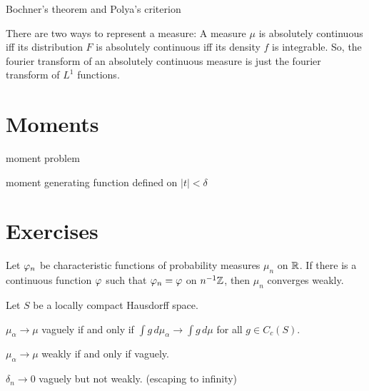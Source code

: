 \documentclass{../note}
\begin{document}
\begin{prb}
Bochner's theorem and Polya's criterion
\end{prb}


There are two ways to represent a measure:
A measure $\mu$ is absolutely continuous iff its distribution $F$ is absolutely continuous iff its density $f$ is integrable.
So, the fourier transform of an absolutely continuous measure is just the fourier transform of $L^1$ functions.



\section{Moments}

moment problem

moment generating function defined on $|t|<\delta$


\section*{Exercises}
\begin{prb}
Let $\varphi_n$ be characteristic functions of probability measures $\mu_n$ on $\mathbb{R}$.
If there is a continuous function $\varphi$ such that $\varphi_n=\varphi$ on $n^{-1}\mathbb{Z}$, then $\mu_n$ converges weakly.
\end{prb}


\begin{prb}
\end{prb}


\begin{prb}
Let $S$ be a locally compact Hausdorff space.
\begin{parts}
\item $\mu_\alpha\to\mu$ vaguely if and only if $\int g\,d\mu_\alpha\to\int g\,d\mu$ for all $g\in C_c(S)$.
\item $\mu_\alpha\to\mu$ weakly if and only if vaguely.
\item $\delta_n\to0$ vaguely but not weakly. (escaping to infinity)
\end{parts}
\end{prb}
\begin{pf}
\end{pf}
\end{document}
